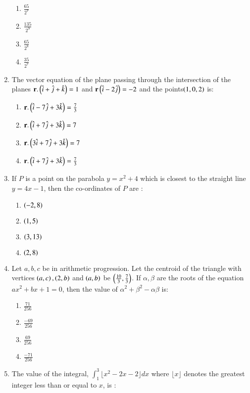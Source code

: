 \documentclass[journal,12pt,onecolumn]{IEEEtran}
\theoremstyle{remark}
\begin{document}
\begin{enumerate}
    \begin{enumerate}
        \item $\frac{65}{2^{7}}$
        \item $\frac{135}{2^{9}}$
        \item $\frac{65}{2^{8}}$
        \item $\frac{35}{2^{7}}$
    \end{enumerate}
    \item The vector equation of the plane passing through the intersection of the planes $\mathbf{r}.\left(\hat{i}+\hat{j}+\hat{k}\right)=1$ and $\mathbf{r}\left(\hat{i}-2\hat{j}\right)=-2$ and the points$\left(1,0,2\right)$ is:
        \begin{enumerate}
        \item $\mathbf{r}.\left(\hat{i}-7\hat{j}+3\hat{k}\right)=\frac{7}{3}$
        \item $\mathbf{r}.\left(\hat{i}+7\hat{j}+3\hat{k}\right)=7$
        \item $\mathbf{r}.\left(3\hat{i}+7\hat{j}+3\hat{k}\right)=7$
        \item $\mathbf{r}.\left(\hat{i}+7\hat{j}+3\hat{k}\right)=\frac{7}{3}$
    \end{enumerate}
    \item If $P$ is a point on the parabola $y = x^2 + 4$ which is closest to the straight line $y = 4x-1$, then the co-ordinates of $P$ are :
    \begin{enumerate}
        \item $\left(-2,8\right)$
        \item $\left(1,5\right)$
        \item $\left(3,13\right)$
        \item $\left(2,8\right)$
    \end{enumerate}
    \item Let $a, b, c$ be in arithmetic progression. Let the centroid of the triangle with vertices $\left(a, c\right), \left(2, b\right)$ and $\left(a, b\right)$ be $\left(\frac{10}{3}, \frac{7}{3}\right)$. If $\alpha,\beta$ are the roots of the equation $ax^2 + bx + 1 = 0$, then the value of $\alpha^2 + \beta^2 - \alpha\beta$ is:
    \begin{enumerate}
        \item $\frac{71}{256}$
        \item $\frac{-69}{256}$
        \item $\frac{69}{256}$
        \item $\frac{-71}{256}$ 
    \end{enumerate}
    \item The value of the integral, $\int_{1}^{3}\lfloor x^2 - 2x- 2\rfloor dx$ where $\lfloor x \rfloor$ denotes the greatest integer less than or equal to $x$, is :

\end{enumerate}
\end{document}
